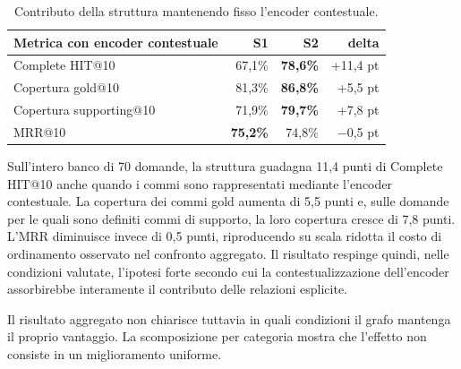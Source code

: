 \begin{table}[H]
    \centering
    \renewcommand{\arraystretch}{1.2}
    \begin{tabular}{|l|r|r|r|}
        \hline
        \textbf{Metrica con encoder contestuale} & \textbf{S1} & \textbf{S2} & \textbf{delta} \\
        \hline
        Complete HIT@10 & 67,1\% & \textbf{78,6\%} & +11,4 pt \\
        Copertura gold@10 & 81,3\% & \textbf{86,8\%} & +5,5 pt \\
        Copertura supporting@10 & 71,9\% & \textbf{79,7\%} & +7,8 pt \\
        MRR@10 & \textbf{75,2\%} & 74,8\% & $-$0,5 pt \\
        \hline
    \end{tabular}
    \caption{Contributo della struttura mantenendo fisso l'encoder contestuale.}
    \label{tab:antitesi_test_diretto}
\end{table}

Sull'intero banco di 70 domande, la struttura guadagna 11,4 punti di Complete HIT@10 anche quando i commi sono rappresentati mediante l'encoder contestuale. La copertura dei commi gold aumenta di 5,5 punti e, sulle domande per le quali sono definiti commi di supporto, la loro copertura cresce di 7,8 punti. L'MRR diminuisce invece di 0,5 punti, riproducendo su scala ridotta il costo di ordinamento osservato nel confronto aggregato. Il risultato respinge quindi, nelle condizioni valutate, l'ipotesi forte secondo cui la contestualizzazione dell'encoder assorbirebbe interamente il contributo delle relazioni esplicite.

Il risultato aggregato non chiarisce tuttavia in quali condizioni il grafo mantenga il proprio vantaggio. La scomposizione per categoria mostra che l'effetto non consiste in un miglioramento uniforme.


